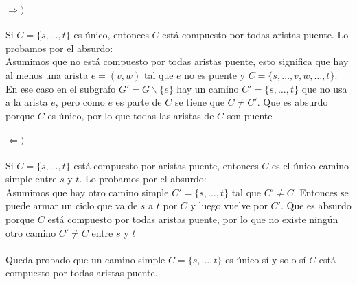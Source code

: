 \documentclass[../main.tex]{subfiles}
\begin{document}
\paragraph{\(\Rightarrow)\)} Si \(C = \{s, \ldots, t\}\) es único, entonces \(C\) está compuesto por todas aristas puente. Lo probamos por el absurdo: \\
Asumimos que no está compuesto por todas aristas puente, esto significa que hay al menos una arista \(e = (v, w)\) tal que \(e\) no es puente y \(C = \{s, \ldots, v, w, \ldots, t\}\). \\
En ese caso en el subgrafo \(G' = G \backslash \{e\}\) hay un camino \(C' = \{s, \ldots, t\}\) que no usa a la arista \(e\), pero como \(e\) es parte de \(C\) se tiene que \(C \neq C'\). Que es absurdo porque \(C\) es único, por lo que todas las aristas de \(C\) son puente\done
\paragraph{\(\Leftarrow)\)} Si \(C = \{s, \ldots, t\}\) está compuesto por aristas puente, entonces \(C\) es el único camino simple entre \(s\)  y \(t\). Lo probamos por el absurdo: \\
Asumimos que hay otro camino simple \(C' = \{s, \ldots, t\}\) tal que \(C' \neq C\). Entonces se puede armar un ciclo que va de \(s\) a \(t\) por \(C\) y luego vuelve por \(C'\). Que es absurdo porque \(C\) está compuesto por todas aristas puente, por lo que no existe ningún otro camino \(C' \neq C\) entre \(s\) y \(t\)\done

\paragraph{} Queda probado que un camino simple \(C = \{s, \ldots, t\}\) es único sí y solo sí \(C\) está compuesto por todas aristas puente.
\end{document}
